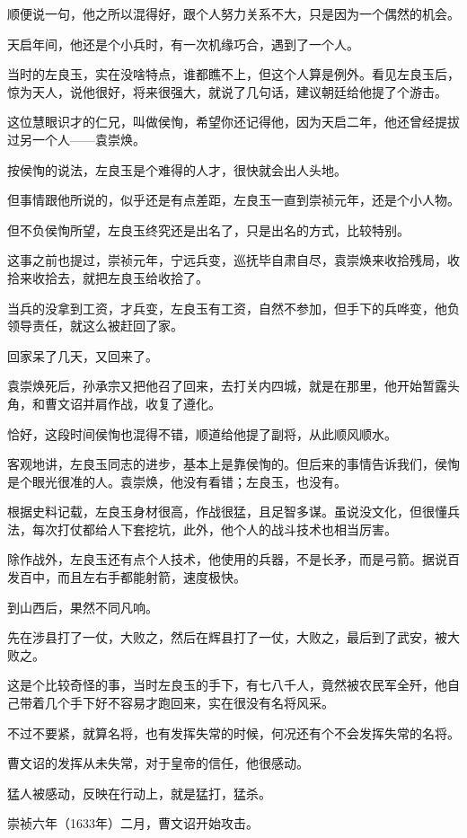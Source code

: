 \begin{multicols}{\theparacolNo}
顺便说一句，他之所以混得好，跟个人努力关系不大，只是因为一个偶然的机会。

天启年间，他还是个小兵时，有一次机缘巧合，遇到了一个人。

当时的左良玉，实在没啥特点，谁都瞧不上，但这个人算是例外。看见左良玉后，惊为天人，说他很好，将来很强大，就说了几句话，建议朝廷给他提了个游击。

这位慧眼识才的仁兄，叫做侯恂，希望你还记得他，因为天启二年，他还曾经提拔过另一个人——袁崇焕。

按侯恂的说法，左良玉是个难得的人才，很快就会出人头地。

但事情跟他所说的，似乎还是有点差距，左良玉一直到崇祯元年，还是个小人物。

但不负侯恂所望，左良玉终究还是出名了，只是出名的方式，比较特别。

这事之前也提过，崇祯元年，宁远兵变，巡抚毕自肃自尽，袁崇焕来收拾残局，收拾来收拾去，就把左良玉给收拾了。

当兵的没拿到工资，才兵变，左良玉有工资，自然不参加，但手下的兵哗变，他负领导责任，就这么被赶回了家。

回家呆了几天，又回来了。

袁崇焕死后，孙承宗又把他召了回来，去打关内四城，就是在那里，他开始暂露头角，和曹文诏并肩作战，收复了遵化。

恰好，这段时间侯恂也混得不错，顺道给他提了副将，从此顺风顺水。

客观地讲，左良玉同志的进步，基本上是靠侯恂的。但后来的事情告诉我们，侯恂是个眼光很准的人。袁崇焕，他没有看错；左良玉，也没有。

根据史料记载，左良玉身材很高，作战很猛，且足智多谋。虽说没文化，但很懂兵法，每次打仗都给人下套挖坑，此外，他个人的战斗技术也相当厉害。

除作战外，左良玉还有点个人技术，他使用的兵器，不是长矛，而是弓箭。据说百发百中，而且左右手都能射箭，速度极快。

到山西后，果然不同凡响。

先在涉县打了一仗，大败之，然后在辉县打了一仗，大败之，最后到了武安，被大败之。

这是个比较奇怪的事，当时左良玉的手下，有七八千人，竟然被农民军全歼，他自己带着几个手下好不容易才跑回来，实在很没有名将风采。

不过不要紧，就算名将，也有发挥失常的时候，何况还有个不会发挥失常的名将。

曹文诏的发挥从未失常，对于皇帝的信任，他很感动。

猛人被感动，反映在行动上，就是猛打，猛杀。

崇祯六年（1633年）二月，曹文诏开始攻击。


\end{multicols}
